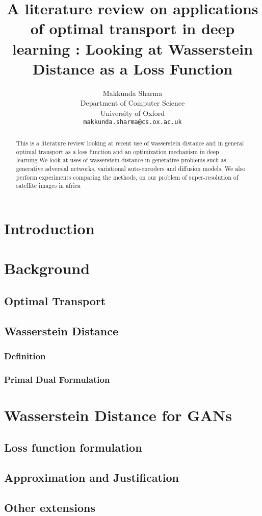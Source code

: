\documentclass{article}
\title{A literature review on applications of optimal transport in deep learning : Looking at Wasserstein Distance as a Loss Function }
\author{%
  Makkunda Sharma \\
  Department of Computer Science\\
  University of Oxford\\
  \texttt{makkunda.sharma@cs.ox.ac.uk} \\
}
\begin{document}
 

\maketitle


\begin{abstract}
 This is a literature review looking at recent use of wasserstein distance and in general optimal transport as a loss function and an optimization mechanism in deep learning.We look at uses of wasserstein distance in generative problems such as generative adversial networks, variational auto-encoders and diffusion models. We also perform experiments comparing the methods, on our problem of super-resolution of satellite images in africa 
\end{abstract}
\section{Introduction}
\section{Background}
\subsection{Optimal Transport}
\subsection{Wasserstein Distance}
\subsubsection{Definition}
\subsubsection{Primal Dual Formulation}
\section{Wasserstein Distance for GANs}
\subsection{Loss function formulation}
\subsection{Approximation and Justification}
\subsection{Other extensions}
\end{document}
